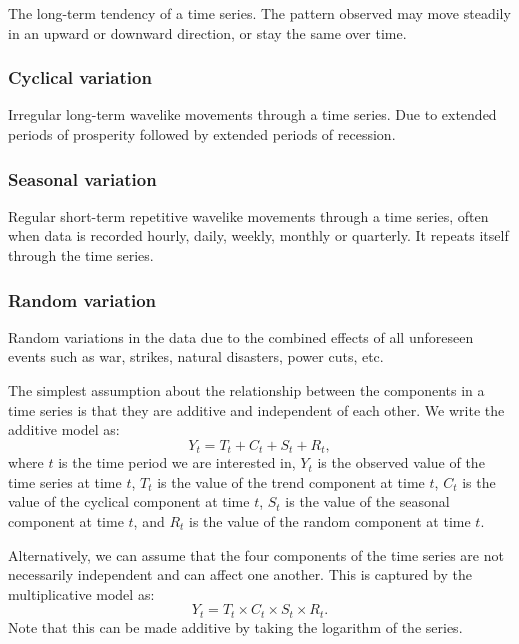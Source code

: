          The long-term tendency of a time series. The pattern observed may move steadily in an upward or downward direction, or stay the same over time.

      \subsubsection{Cyclical variation}

         Irregular long-term wavelike movements through a time series. Due to extended periods of prosperity followed by extended periods of recession.

      \subsubsection{Seasonal variation}

         Regular short-term repetitive wavelike movements through a time series, often when data is recorded hourly, daily, weekly, monthly or quarterly. It repeats itself through the time series.

      \subsubsection{Random variation}

         Random variations in the data due to the combined effects of all unforeseen events such as war, strikes, natural disasters, power cuts, etc. 

      \vspace{1em}

      The simplest assumption about the relationship between the components in a time series is that they are additive and independent of each other. We write the additive model as: \[Y_{t} = T_{t} + C_{t} + S_{t} + R_{t},\] where \(t\) is the time period we are interested in, \(Y_{t}\) is the observed value of the time series at time \(t\), \(T_{t}\) is the value of the trend component at time \(t\), \(C_{t}\) is the value of the cyclical component at time \(t\), \(S_{t}\) is the value of the seasonal component at time \(t\), and \(R_{t}\) is the value of the random component at time \(t\).

      \vspace{1em}

      Alternatively, we can assume that the four components of the time series are not necessarily independent and can affect one another. This is captured by the multiplicative model as: \[Y_{t} = T_{t} \times C_{t} \times S_{t} \times R_{t}.\] Note that this can be made additive by taking the logarithm of the series.

